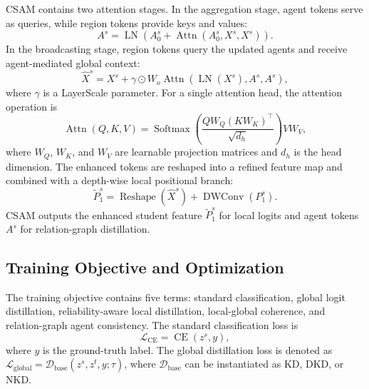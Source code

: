 \documentclass[a4paper,fleqn]{cas-dc}
\begin{document}
CSAM contains two attention stages. In the aggregation stage, agent tokens
serve as queries, while region tokens provide keys and values:
\begin{equation}
    A^{s}=\operatorname{LN}\left(A_0^{s}+
    \operatorname{Attn}(A_0^{s},X^{s},X^{s})\right).
\label{eq:ama_aggregation}
\end{equation}
In the broadcasting stage, region tokens query the updated agents and receive
agent-mediated global context:
\begin{equation}
    \hat{X}^{s}=X^{s}+
    \gamma\odot W_o
    \operatorname{Attn}(\operatorname{LN}(X^{s}),A^{s},A^{s}),
\label{eq:ama_broadcast}
\end{equation}
where $\gamma$ is a LayerScale parameter. For a single attention head, the
attention operation is
\begin{equation}
    \operatorname{Attn}(Q,K,V)=
    \operatorname{Softmax}\left(\frac{QW_Q(KW_K)^\top}{\sqrt{d_h}}\right)VW_V,
\label{eq:attention}
\end{equation}
where $W_Q$, $W_K$, and $W_V$ are learnable projection matrices and $d_h$ is
the head dimension. The enhanced tokens are reshaped into a refined feature
map and combined with a depth-wise local positional branch:
\begin{equation}
    \tilde{P}_1^{s}=\operatorname{Reshape}(\hat{X}^{s})
    +\operatorname{DWConv}(P_1^s).
\label{eq:ama_output}
\end{equation}
CSAM outputs the enhanced student feature $\tilde{P}_1^s$ for local logits
and agent tokens $A^s$ for relation-graph distillation.

\subsection{Training Objective and Optimization}

The training objective contains five terms: standard classification, global
logit distillation, reliability-aware local distillation, local-global
coherence, and relation-graph agent consistency. The standard classification
loss is
\begin{equation}
    \mathcal{L}_{\operatorname{CE}}=\operatorname{CE}(z^s,y),
\label{eq:loss_ce}
\end{equation}
where $y$ is the ground-truth label. The global distillation loss is denoted
as $\mathcal{L}_{\operatorname{global}}=
\mathcal{D}_{\operatorname{base}}(z^s,z^t,y;\tau)$, where
$\mathcal{D}_{\operatorname{base}}$ can be instantiated as KD, DKD, or NKD.
\end{document}

